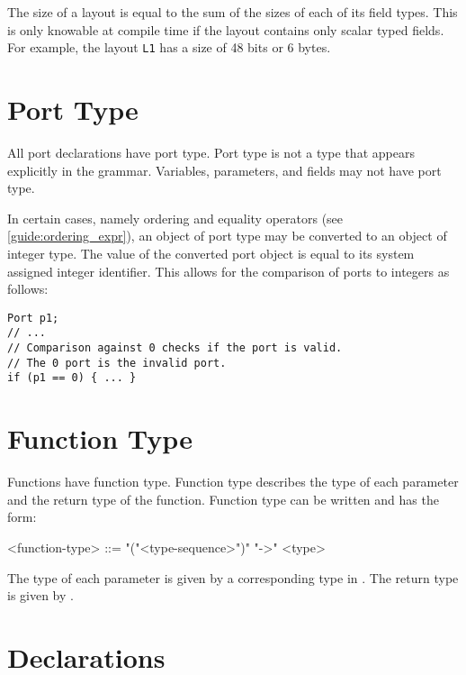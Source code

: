 The size of a layout is equal to the sum of the sizes of each of its field types. This is only knowable at compile time if the layout contains only scalar typed fields. For example, the layout \texttt{L1} has a size of 48 bits or 6 bytes.

\section{Port Type} \label{guide:port_type}

All port declarations have port type. Port type is not a type that appears explicitly in the grammar. Variables, parameters, and fields may not have port type.

In certain cases, namely ordering and equality operators (see \ref{guide:ordering_expr}), an object of port type may be converted to an object of integer type. The value of the converted port object is equal to its system assigned integer identifier. This allows for the comparison of ports to integers as follows:

\begin{minip}
\begin{lstlisting}
Port p1;
// ...
// Comparison against 0 checks if the port is valid.
// The 0 port is the invalid port.
if (p1 == 0) { ... }
\end{lstlisting}
\end{minip}

\section{Function Type} \label{guide:function_type}

Functions have function type. Function type describes the type of each parameter and the return type of the function. Function type can be written and has the form:

\begin{minip}
\begin{grammar}
<function-type> ::= "("<type-sequence>")" "->" <type>
\end{grammar}
\end{minip}

The type of each parameter is given by a corresponding type in . The return type is given by .

\section{Declarations} \label{guide:declarations}

